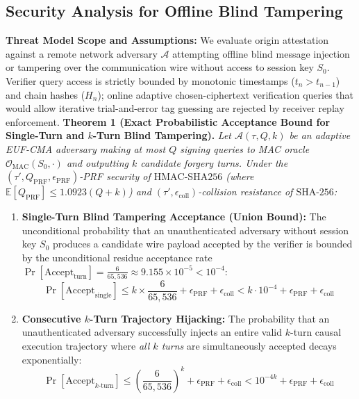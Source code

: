 \documentclass[9pt,a4paper]{extarticle}
\begin{document}
\subsection{Security Analysis for Offline Blind Tampering}
\textbf{Threat Model Scope and Assumptions:} We evaluate origin attestation against a remote network adversary $\mathcal{A}$ attempting offline blind message injection or tampering over the communication wire without access to session key $S_0$. Verifier query access is strictly bounded by monotonic timestamps ($t_n > t_{n-1}$) and chain hashes ($H_n$); online adaptive chosen-ciphertext verification queries that would allow iterative trial-and-error tag guessing are rejected by receiver replay enforcement.
\textbf{Theorem 1 (Exact Probabilistic Acceptance Bound for Single-Turn and $k$-Turn Blind Tampering).} \emph{Let $\mathcal{A}(\tau, Q, k)$ be an adaptive EUF-CMA adversary making at most $Q$ signing queries to MAC oracle $\mathcal{O}_{\text{MAC}}(S_0, \cdot)$ and outputting $k$ candidate forgery turns. Under the $(\tau', Q_{\text{PRF}}, \epsilon_{\text{PRF}})$-PRF security of $\text{HMAC-SHA256}$ (where $\mathbb{E}[Q_{\text{PRF}}] \le 1.0923(Q+k)$) and $(\tau', \epsilon_{\text{coll}})$-collision resistance of $\text{SHA-256}$:}
\begin{enumerate}[leftmargin=1.4em,itemsep=1pt,topsep=1pt]
  \item \textbf{Single-Turn Blind Tampering Acceptance (Union Bound):} The unconditional probability that an unauthenticated adversary without session key $S_0$ produces a candidate wire payload accepted by the verifier is bounded by the unconditional residue acceptance rate $\Pr[\text{Accept}_{\text{turn}}] = \frac{6}{65{,}536} \approx 9.155 \times 10^{-5} < 10^{-4}$:
  \begin{equation}
    \Pr[\text{Accept}_{\text{single}}] \le k \times \frac{6}{65{,}536} + \epsilon_{\text{PRF}} + \epsilon_{\text{coll}} < k \cdot 10^{-4} + \epsilon_{\text{PRF}} + \epsilon_{\text{coll}}
    \label{eq:single_forgery}
  \end{equation}
  \item \textbf{Consecutive $k$-Turn Trajectory Hijacking:} The probability that an unauthenticated adversary successfully injects an entire valid $k$-turn causal execution trajectory where \emph{all $k$ turns} are simultaneously accepted decays exponentially:
  \begin{equation}
    \Pr[\text{Accept}_{k\text{-turn}}] \le \left(\frac{6}{65{,}536}\right)^k + \epsilon_{\text{PRF}} + \epsilon_{\text{coll}} < 10^{-4k} + \epsilon_{\text{PRF}} + \epsilon_{\text{coll}}
    \label{eq:forgery_bound}
  \end{equation}
\end{enumerate}
\end{document}

